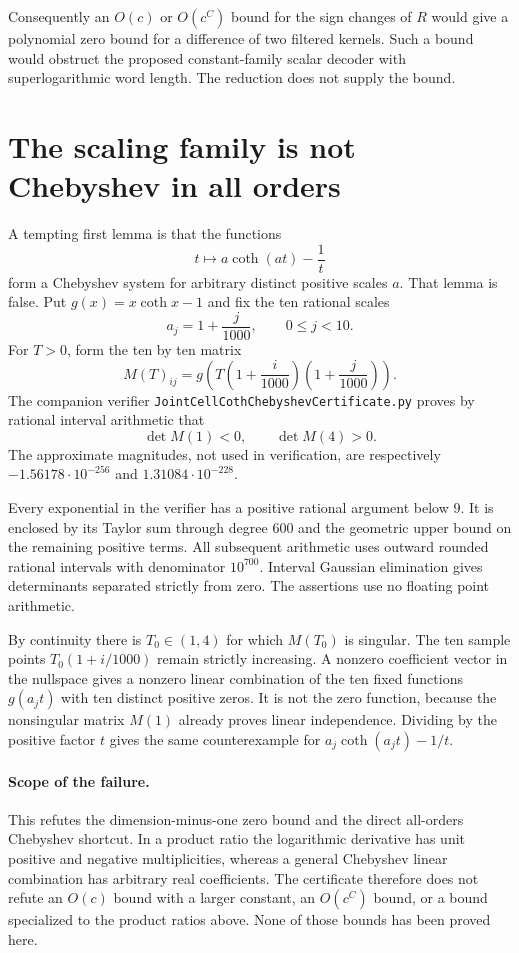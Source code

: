 \documentclass[11pt]{article}
\begin{document}
Consequently an $O(c)$ or $O(c^C)$ bound for the sign changes of $R$
would give a polynomial zero bound for a difference of two filtered
kernels. Such a bound would obstruct the proposed constant-family
scalar decoder with superlogarithmic word length. The reduction does
not supply the bound.

\section{The scaling family is not Chebyshev in all orders}

A tempting first lemma is that the functions
\[
 t\longmapsto a\coth(at)-\frac1t
\]
form a Chebyshev system for arbitrary distinct positive scales $a$.
That lemma is false. Put $g(x)=x\coth x-1$ and fix the ten rational
scales
\[
 a_j=1+\frac{j}{1000},\qquad 0\leq j<10.
\]
For $T>0$, form the ten by ten matrix
\[
 M(T)_{ij}=g\left(T\left(1+\frac{i}{1000}\right)
                         \left(1+\frac{j}{1000}\right)\right).
\]
The companion verifier
\texttt{JointCellCothChebyshevCertificate.py} proves by rational interval
arithmetic that
\[
 \det M(1)<0,\qquad \det M(4)>0.
\]
The approximate magnitudes, not used in verification, are respectively
$-1.56178\cdot10^{-256}$ and $1.31084\cdot10^{-228}$.

Every exponential in the verifier has a positive rational argument below
$9$. It is enclosed by its Taylor sum through degree $600$ and the
geometric upper bound on the remaining positive terms. All subsequent
arithmetic uses outward rounded rational intervals with denominator
$10^{700}$. Interval Gaussian elimination gives determinants separated
strictly from zero. The assertions use no floating point arithmetic.

By continuity there is $T_0\in(1,4)$ for which $M(T_0)$ is singular.
The ten sample points $T_0(1+i/1000)$ remain strictly increasing. A
nonzero coefficient vector in the nullspace gives a nonzero linear
combination of the ten fixed functions $g(a_jt)$ with ten distinct
positive zeros. It is not the zero function, because the nonsingular
matrix $M(1)$ already proves linear independence. Dividing by the
positive factor $t$ gives the same counterexample for
$a_j\coth(a_jt)-1/t$.

\paragraph{Scope of the failure.}
This refutes the dimension-minus-one zero bound and the direct
all-orders Chebyshev shortcut. In a product ratio the logarithmic
derivative has unit positive and negative multiplicities, whereas a
general Chebyshev linear combination has arbitrary real coefficients.
The certificate therefore does not refute an $O(c)$ bound with a larger
constant, an $O(c^C)$ bound, or a bound specialized to the product ratios
above. None of those bounds has been proved here.
\end{document}
